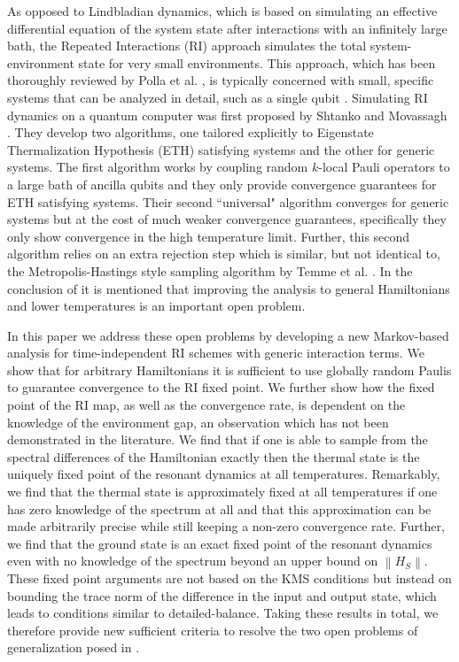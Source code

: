 \documentclass[
 amsmath,amssymb,
 aps,
onecolumn, 
nofootinbib]{revtex4-2}
\newcommand{\norm}[1]{\left\| #1 \right\|}
\begin{document}
As opposed to Lindbladian dynamics, which is based on simulating an effective differential equation of the system state after interactions with an infinitely large bath, the Repeated Interactions (RI) approach simulates the total system-environment state for very small environments. This approach, which has been thoroughly reviewed by Polla et al. \cite{polla2021quantum}, is typically concerned with small, specific systems that can be analyzed in detail, such as a single qubit \cite{prositto2025equilibrium}. Simulating RI dynamics on a quantum computer was first proposed by Shtanko and Movassagh \cite{shtanko2023preparingthermalstatesnoiseless}. They develop two algorithms, one tailored explicitly to Eigenstate Thermalization Hypothesis (ETH) satisfying systems and the other for generic systems. The first algorithm works by coupling random $k$-local Pauli operators to a large bath of ancilla qubits and they only provide convergence guarantees for ETH satisfying systems. Their second ``universal" algorithm converges for generic systems but at the cost of much weaker convergence guarantees, specifically they only show convergence in the high temperature limit. Further, this second algorithm relies on an extra rejection step which is similar, but not identical to, the Metropolis-Hastings style sampling algorithm by Temme et al. \cite{temme2011}. In the conclusion of \cite{shtanko2023preparingthermalstatesnoiseless} it is mentioned that improving the analysis to general Hamiltonians and lower temperatures is an important open problem.

In this paper we address these open problems by developing a new Markov-based analysis for time-independent RI schemes with generic interaction terms. We show that for arbitrary Hamiltonians it is sufficient to use globally random Paulis to guarantee convergence to the RI fixed point. We further show how the fixed point of the RI map, as well as the convergence rate, is dependent on the knowledge of the environment gap, an observation which has not been demonstrated in the literature. We find that if one is able to sample from the spectral differences of the Hamiltonian exactly then the thermal state is the uniquely fixed point of the resonant dynamics at all temperatures. Remarkably, we find that the thermal state is approximately fixed at all temperatures if one has zero knowledge of the spectrum at all and that this approximation can be made arbitrarily precise while still keeping a non-zero convergence rate. Further, we find that the ground state is an exact fixed point of the resonant dynamics even with no knowledge of the spectrum beyond an upper bound on $\norm{H_S}$. These fixed point arguments are not based on the KMS conditions but instead on bounding the trace norm of the difference in the input and output state, which leads to conditions similar to detailed-balance. Taking these results in total, we therefore provide new sufficient criteria to resolve the two open problems of generalization posed in \cite{shtanko2023preparingthermalstatesnoiseless}.
\end{document}
